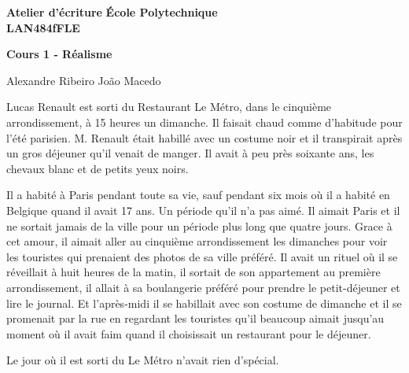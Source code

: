 \documentclass[10pt]{article} %
\newcommand{\createHeader}[6]{
	\noindent
	\normalsize\textbf{#2} \hfill \textbf{#1}\\
	\normalsize\textbf{#3} \hfill \textbf{\displaydate{#6}}\vspace{20pt}
	\centerline{\Large \textbf{#5}}\vspace{3pt}
	\centerline{\normalsize #4}\vspace{20pt}}
\begin{document}
\createHeader{École Polytechnique}{Atelier d'écriture}{LAN484fFLE}{Alexandre Ribeiro João Macedo}{Cours 1 - Réalisme}{date}

Lucas Renault est sorti du Restaurant Le Métro, dans le cinquième arrondissement, à 15 heures un dimanche. Il faisait chaud comme d'habitude pour l'été parisien. M. Renault était habillé avec un costume noir et il transpirait après un gros déjeuner qu'il venait de manger. Il avait à peu près soixante ans, les chevaux blanc et de petits yeux noirs. 

Il a habité à Paris pendant toute sa vie, sauf pendant six mois où il a habité en Belgique quand il avait 17 ans. Un période qu'il n'a pas aimé. Il aimait Paris et il ne sortait jamais de la ville pour un période plus long que quatre jours. Grace à cet amour, il aimait aller au cinquième arrondissement les dimanches pour voir les touristes qui prenaient des photos de sa ville préféré. Il avait un rituel où il se réveillait à huit heures de la matin, il sortait de son appartement au première arrondissement, il allait à sa boulangerie préféré pour prendre le petit-déjeuner et lire le journal. Et l'après-midi il se habillait avec son costume de dimanche et il se promenait par la rue en regardant les touristes qu'il beaucoup aimait jusqu'au moment où il avait faim quand il choisissait un restaurant pour le déjeuner.

Le jour où il est sorti du Le Métro n'avait rien d'spécial.
\end{document}
